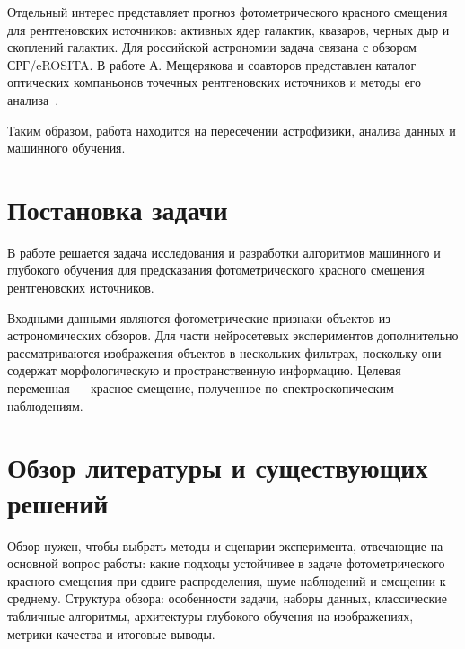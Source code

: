 \documentclass[12pt,a4paper]{article}
\begin{document}
Отдельный интерес представляет прогноз фотометрического красного смещения для рентгеновских источников: активных ядер галактик, квазаров, черных дыр и скоплений галактик. Для российской астрономии задача связана с обзором СРГ/eROSITA. В работе А. Мещерякова и соавторов представлен каталог оптических компаньонов точечных рентгеновских источников и методы его анализа~\cite{meshcheryakov2022}.

Таким образом, работа находится на пересечении астрофизики, анализа данных и машинного обучения.

\newpage
\section{Постановка задачи}

В работе решается задача исследования и разработки алгоритмов машинного и глубокого обучения для предсказания фотометрического красного смещения рентгеновских источников.

Входными данными являются фотометрические признаки объектов из астрономических обзоров. Для части нейросетевых экспериментов дополнительно рассматриваются изображения объектов в нескольких фильтрах, поскольку они содержат морфологическую и пространственную информацию. Целевая переменная — красное смещение, полученное по спектроскопическим наблюдениям.

\newpage
\section{Обзор литературы и существующих решений}
\label{sec:review}

Обзор нужен, чтобы выбрать методы и сценарии эксперимента, отвечающие на основной вопрос работы: какие подходы устойчивее в задаче фотометрического красного смещения при сдвиге распределения, шуме наблюдений и смещении к среднему. Структура обзора: особенности задачи, наборы данных, классические табличные алгоритмы, архитектуры глубокого обучения на изображениях, метрики качества и итоговые выводы.
\end{document}
